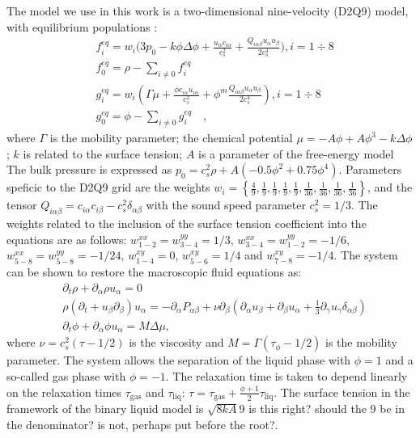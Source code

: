 \documentclass{article}
\newcommand{\todo}[1]{{\color{red}#1}}
\begin{document}
The model we use in this work is a two-dimensional nine-velocity (D2Q9) model,
with equilibrium populations \cite{pooley-contact}:
\begin{equation}
\begin{aligned}
&f_i^{eq}=w_i 
\biggl(3
p_0 - k \phi \Delta \phi
+\frac{u_{\alpha}c_{i\alpha}}{c_s^2}+\frac{Q_{i\alpha\beta}u_{\alpha } u_ {
\beta}}{2 c_s^4}\biggr), i=1\div8\\
&f_0^{eq}=\rho-\sum_{i\neq0}{f_i^{eq}}\\
&g_i^{eq}=w_i\left(\Gamma \mu + \frac{\phi c_{i\alpha} u_{i\alpha}}{c_s^2}+\phi^m
\frac{Q_{i\alpha\beta}u_{\alpha}u_{\beta}}{2 c_s^4}\right), i=1\div8 \\
&g_0^{eq}=\phi-\sum_{i\neq0}{g_i^{eq}}\quad,
\end{aligned}
\end{equation}
where $\Gamma$ is the mobility parameter; the chemical potential
$\mu=-A\phi+A\phi^3-k\Delta\phi$; $k$ is related to the surface
tension; $A$ is a parameter of the free-energy model  The bulk pressure
is expressed as $p_0=c_s^2 \rho +A (-0.5 \phi^2+0.75 \phi^4)$. 
Parameters speficic to the D2Q9 grid are the weights
$w_i=\left\{\frac{4}{9},\frac{1}{9},\frac{1}{9},\frac{1}{9},\frac{1}{9},
\frac{1}{36},\frac{1}{36},\frac{1}{36},\frac{1}{36}\right\}$, and the tensor
$Q_{i\alpha\beta}=c_{i\alpha} c_{i\beta} - c_s^2 \delta_{\alpha\beta}$ with
the sound speed parameter $c_s^2=1/3$.  The weights related to the
inclusion of the surface tension coefficient into the equations are as follows:
$w^{xx}_{1-2}=w^{yy}_{3-4}=1/3$, $w^{xx}_{3-4}=w^{yy}_{1-2}=-1/6$,
$w^{xx}_{5-8}=w^{yy}_{5-8}=-1/24$, $w^{xy}_{1-4}=0$, $w^{xy}_{5-6}=1/4$ and
$w^{xy}_{7-8}=-1/4$. The system can be shown to restore the macroscopic
fluid equations as:
\begin{equation}
\begin{aligned}
&\partial_t \rho+ \partial_{\alpha} \rho u_{\alpha}=0\\
&\rho\left(\partial_t+u_{\beta}\partial_{\beta}\right) u_{\alpha}=
-\partial_{\alpha}P_{\alpha \beta} +
\nu\partial_{\beta}\left(\partial_{\alpha}u_{\beta}+\partial_{\beta} u_{\alpha}
+ \frac{1}{3}\partial_{\gamma} u_{\gamma} \delta_{\alpha\beta}\right)\\
&\partial_t \phi + \partial_{\alpha} \phi u_{\alpha}=M \Delta \mu,
\end{aligned}
\label{binary:fluid:system}
\end{equation}
where $\nu=c_s^2 (\tau-1/2)$ is the viscosity and
$M=\Gamma(\tau_{\phi}-1/2)$ is the mobility parameter. The system allows the separation of the liquid
phase with $\phi=1$ and a so-called gas phase with $\phi=-1$. The
relaxation time is taken to depend linearly on the relaxation
times $\tau_{\mathrm{gas}}$ and $\tau_{\mathrm{liq}}$:
$\tau=\tau_{\mathrm{gas}}+\frac{\phi+1}{2}\tau_{\mathrm{liq}}$.
The surface tension in the framework of the binary liquid model is $\sqrt{8 k A}{9}$ \todo{is this right?  should the 9 be in the
denominator?  is not, perhaps put before the root?}.
\end{document}
